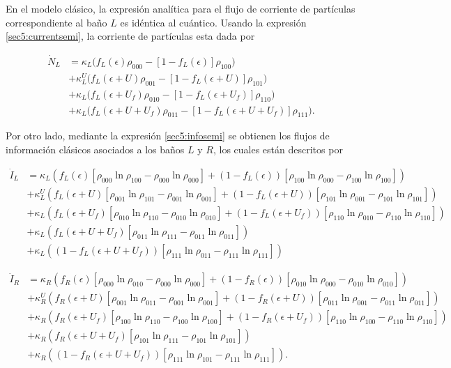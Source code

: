 En el modelo clásico, la expresión analítica para el flujo de corriente de partículas correspondiente al baño $L$ es idéntica al cuántico. Usando la expresión \ref{sec5:currentsemi}, la corriente de partículas esta dada por  

\begin{align*}
    \dot{N}_{L} & = \kappa_{L}\big(f_{L}(\epsilon)\rho_{000} - [1-f_{L}(\epsilon)]\rho_{100} \big) \\
        & + \kappa^{U}_{L} \big(f_{L}(\epsilon+U)\rho_{001} - [1-f_{L}(\epsilon+U)]\rho_{101} \big)  \\
        & + \kappa_{L} \big(f_{L}(\epsilon+U_{f})\rho_{010} - [1-f_{L}(\epsilon+U_{f})]\rho_{110} \big)  \\  
        & + \kappa_{L} \big(f_{L}(\epsilon+U + U_{f})\rho_{011} - [1-f_{L}(\epsilon+U+U_{f})]\rho_{111} \big).
\end{align*}

Por otro lado, mediante la expresión \ref{sec5:infosemi} se obtienen los flujos de información clásicos asociados a los baños $L$ y $R$, los cuales están descritos por

\begin{align*}
  \dot{I}_{L}  &  =  \kappa_{L}(f_{L}(\epsilon)[\rho_{000}\ln \rho_{100} - \rho_{000}\ln \rho_{000}] + (1-f_{L}(\epsilon))[\rho_{100}\ln \rho_{000} - \rho_{100}\ln \rho_{100} ] )  \\ 
      & + \kappa^{U}_{L}(f_{L}(\epsilon + U)[\rho_{001}\ln \rho_{101} - \rho_{001}\ln \rho_{001}] + (1-f_{L}(\epsilon + U))[\rho_{101}\ln \rho_{001} -\rho_{101}\ln \rho_{101} ]   ) \\  
      & + \kappa_{L}( f_{L}(\epsilon + U_{f})[\rho_{010}\ln \rho_{110} -\rho_{010}\ln \rho_{010} ]  + (1-f_{L}(\epsilon + U_{f}))[\rho_{110}\ln \rho_{010} - \rho_{110}\ln \rho_{110} ] ) \\  
      & + \kappa_{L}( f_{L}(\epsilon + U + U_{f})[\rho_{011}\ln \rho_{111}- \rho_{011}\ln \rho_{011}]) \\   
      & + \kappa_{L}( (1-f_{L}(\epsilon+U+U_{f}) )[\rho_{111}\ln \rho_{011} - \rho_{111}\ln \rho_{111}])   
\end{align*}

\begin{align*}
 \dot{I}_{R} & =  \kappa_{R}(f_{R}(\epsilon)[\rho_{000}\ln \rho_{010} - \rho_{000}\ln \rho_{000}] + (1-f_{R}(\epsilon))[\rho_{010}\ln \rho_{000} - \rho_{010}\ln \rho_{010} ] )  \\ 
      & + \kappa^{U}_{R}(f_{R}(\epsilon + U)[\rho_{001}\ln \rho_{011} - \rho_{001}\ln \rho_{001}] + (1-f_{R}(\epsilon + U))[\rho_{011}\ln \rho_{001} -\rho_{011}\ln \rho_{011} ]   ) \\  
      & + \kappa_{R}( f_{R}(\epsilon + U_{f})[\rho_{100}\ln \rho_{110} - \rho_{100}\ln \rho_{100} ]  + (1-f_{R}(\epsilon + U_{f}))[\rho_{110}\ln \rho_{100} - \rho_{110}\ln \rho_{110} ] ) \\  
      & + \kappa_{R}( f_{R}(\epsilon + U + U_{f})[\rho_{101}\ln \rho_{111}- \rho_{101}\ln \rho_{101}]) \\   
      & + \kappa_{R}( (1-f_{R}(\epsilon+U+U_{f}) )[\rho_{111}\ln \rho_{101} - \rho_{111}\ln \rho_{111}]).   
\end{align*}

